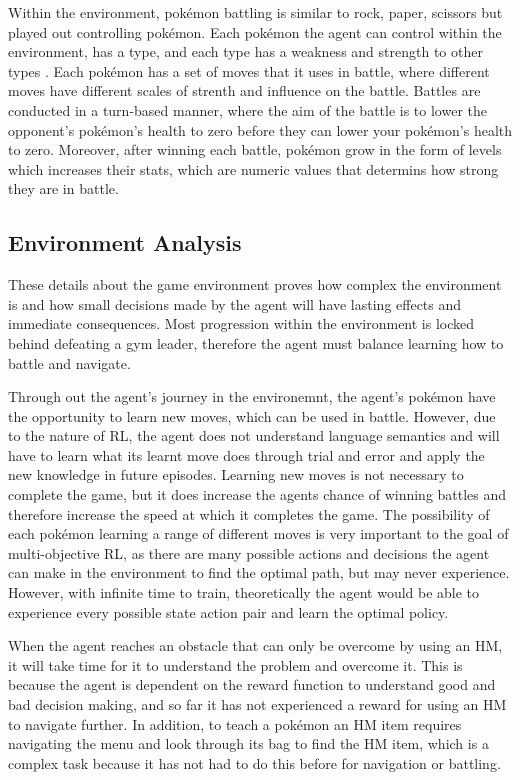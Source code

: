 Within the environment, pokémon battling is similar to rock, paper, scissors but played out controlling pokémon. Each pokémon the agent can control within the environment, has a type, and each type has a weakness and strength to other types \cite{SerebiiTeam2016}. Each pokémon has a set of moves that it uses in battle, where different moves have different scales of strenth and influence on the battle. Battles are conducted in a turn-based manner, where the aim of the battle is to lower the opponent's pokémon's health to zero before they can lower your pokémon's health to zero. Moreover, after winning each battle, pokémon grow in the form of levels which increases their stats, which are numeric values that determins how strong they are in battle. 


\subsection{Environment Analysis}

These details about the game environment proves how complex the environment is and how small decisions made by the agent will have lasting effects and immediate consequences. Most progression within the environment is locked behind defeating a gym leader, therefore the agent must balance learning how to battle and navigate. 

Through out the agent's journey in the environemnt, the agent's pokémon have the opportunity to learn new moves, which can be used in battle. However, due to the nature of RL, the agent does not understand language semantics and will have to learn what its learnt move does through trial and error and apply the new knowledge in future episodes. Learning new moves is not necessary to complete the game, but it does increase the agents chance of winning battles and therefore increase the speed at which it completes the game. The possibility of each pokémon learning a range of different moves is very important to the goal of multi-objective RL, as there are many possible actions and decisions the agent can make in the environment to find the optimal path, but may never experience. However, with infinite time to train, theoretically the agent would be able to experience every possible state action pair and learn the optimal policy. 

When the agent reaches an obstacle that can only be overcome by using an HM, it will take time for it to understand the problem and overcome it. This is because the agent is dependent on the reward function to understand good and bad decision making, and so far it has not experienced a reward for using an HM to navigate further. In addition, to teach a pokémon an HM item requires navigating the menu and look through its bag to find the HM item, which is a complex task because it has not had to do this before for navigation or battling.

